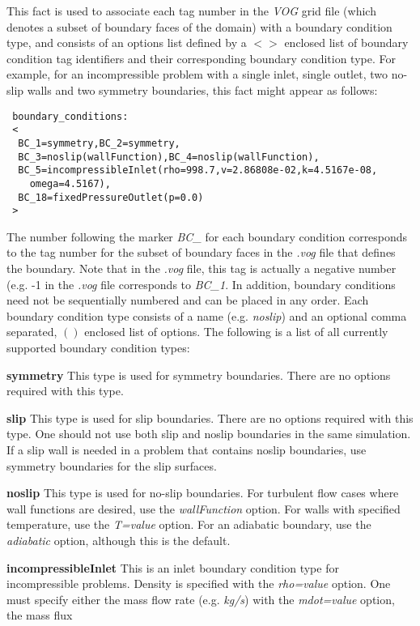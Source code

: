 \documentclass{article}
\begin{document}
\begin{enumerate}
This fact is used to associate each tag number in the \emph{VOG} grid file
(which denotes a subset of boundary faces of the domain) with a boundary
condition type, and consists of an options list defined by a $< >$ enclosed
list of boundary condition tag identifiers and their corresponding boundary
condition type. For example, for an incompressible problem with a single inlet,
single outlet, two no-slip walls and two symmetry boundaries, this fact might
appear as follows:
\begin{verbatim}
 boundary_conditions:
 <
  BC_1=symmetry,BC_2=symmetry,
  BC_3=noslip(wallFunction),BC_4=noslip(wallFunction),
  BC_5=incompressibleInlet(rho=998.7,v=2.86808e-02,k=4.5167e-08,
    omega=4.5167),
  BC_18=fixedPressureOutlet(p=0.0)
 >
\end{verbatim}
The number following the marker \emph{BC\_} for each boundary condition
corresponds to the tag number for the subset of boundary faces in the
\emph{.vog} file that defines the boundary. Note that in the \emph{.vog} file,
this tag is actually a negative number (e.g. -1 in the \emph{.vog} file
corresponds to \emph{BC\_1}. In addition, boundary conditions need not be
sequentially numbered and can be placed in any order. Each boundary condition
type consists of a name (e.g. \emph{noslip}) and an optional comma separated,
$()$ enclosed list of options. The following is a list of all currently
supported boundary condition types:
\begin{description}
  \item{\bf symmetry} This type is used for symmetry boundaries.
There are no options required with this type.
  \item{\bf slip} This type is used for slip boundaries. There are no options
required with this type. One should not use both slip and noslip boundaries
in the same simulation. If a slip wall is needed in a problem that contains
noslip boundaries, use symmetry boundaries for the slip surfaces.
  \item{\bf noslip} This type is used for no-slip boundaries. For turbulent flow
cases where wall functions are desired, use the \emph{wallFunction} option.
For walls with specified temperature, use the \emph{T=value} option. For
an adiabatic boundary, use the \emph{adiabatic} option, although this is the
default.
  \item{\bf incompressibleInlet} This is an inlet boundary condition type for
incompressible problems. Density is
specified with the \emph{rho=value} option. One must specify either the mass
flow rate (e.g. \emph{kg/s}) with the \emph{mdot=value} option, the mass flux

\end{description}
\end{enumerate}
\end{document}
